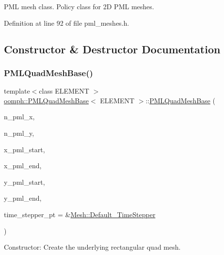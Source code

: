 P\+ML mesh class. Policy class for 2D P\+ML meshes. 

Definition at line 92 of file pml\+\_\+meshes.\+h.



\subsection{Constructor \& Destructor Documentation}
\mbox{\label{classoomph_1_1PMLQuadMeshBase_aff4042f75a253b56f06cb321605c2afe}} 
\subsubsection{\texorpdfstring{P\+M\+L\+Quad\+Mesh\+Base()}{PMLQuadMeshBase()}}
{\footnotesize\ttfamily template$<$class E\+L\+E\+M\+E\+NT $>$ \\
\hyperlink{classoomph_1_1PMLQuadMeshBase}{oomph\+::\+P\+M\+L\+Quad\+Mesh\+Base}$<$ E\+L\+E\+M\+E\+NT $>$\+::\hyperlink{classoomph_1_1PMLQuadMeshBase}{P\+M\+L\+Quad\+Mesh\+Base} (\begin{DoxyParamCaption}\item[{const unsigned \&}]{n\+\_\+pml\+\_\+x,  }\item[{const unsigned \&}]{n\+\_\+pml\+\_\+y,  }\item[{const double \&}]{x\+\_\+pml\+\_\+start,  }\item[{const double \&}]{x\+\_\+pml\+\_\+end,  }\item[{const double \&}]{y\+\_\+pml\+\_\+start,  }\item[{const double \&}]{y\+\_\+pml\+\_\+end,  }\item[{\hyperlink{classoomph_1_1TimeStepper}{Time\+Stepper} $\ast$}]{time\+\_\+stepper\+\_\+pt = {\ttfamily \&\hyperlink{classoomph_1_1Mesh_a12243d0fee2b1fcee729ee5a4777ea10}{Mesh\+::\+Default\+\_\+\+Time\+Stepper}} }\end{DoxyParamCaption})\hspace{0.3cm}{\ttfamily [inline]}}



Constructor\+: Create the underlying rectangular quad mesh. 



